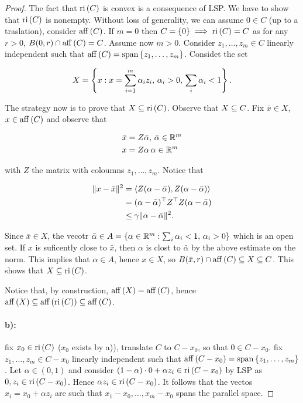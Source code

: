 \begin{proof}
    
    The fact that $\mathrm{ri}\left(C\right)$ is convex is a consequence of LSP. We have to show that $\mathrm{ri}\left(C\right)$ is nonempty. Without loss of generality, we can assume $0 \in C$ (up to a traslation), consider $\mathrm{aff}\left(C\right)$. If $m = 0$ then $C = \left\{ 0 \right\} \implies \mathrm{ri}\left(C\right) = C$ as for any $r > 0$, $B(0,r) \cap \mathrm{aff}\left(C\right) = C$. Assume now $m > 0$. Consider $z_1,\dots,z_m \in C$ linearly independent such that $\mathrm{aff}\left(C\right) = \mathrm{span}\left\{ z_1,\dots,z_m \right\}$. Considet the set 

    \[ X = \left\{ x : x = \sum_{i=1}^m \alpha_i z_i,\,\alpha_i > 0,\, \sum_i \alpha_i < 1 \right\}. \]

    The strategy now is to prove that $X \subseteq \mathrm{ri}\left(C\right)$. Observe that $X \subseteq C$. Fix $\bar{x} \in X$, $x \in \mathrm{aff}\left(C\right)$ and observe that 
    
    \begin{align*}
        \bar{x} &= Z \bar{\alpha},\, \bar{\alpha } \in \mathbb{R}^m \\
        x &= Z \alpha \, \alpha \in \mathbb{R}^m
    \end{align*}

    with $Z$ the matrix with coloumns $z_1,\dots,z_m$. Notice that 

    \begin{align*}
        \lVert x - \bar{x} \rVert^2 &= \langle Z(\alpha - \bar{\alpha}), Z(\alpha - \bar{\alpha}) \rangle \\
            &= (\alpha - \bar{\alpha})^\top Z^\top Z (\alpha - \bar{\alpha}) \\
            &\le \gamma \lVert \alpha - \bar{\alpha} \rVert^2.
    \end{align*}

    Since $\bar{x} \in X$, the vecotr $\bar{\alpha} \in A = \left\{ \alpha \in \mathbb{R}^m : \sum_{i} \alpha_i < 1, \, \alpha_i > 0 \right\}$ which is an open set. If $x$ is suficently close to $\bar{x}$, then $\alpha$ is clost to $\bar{\alpha}$ by the above estimate on the norm. This implies that $\alpha \in A$, hence $x \in X$, so $B(\bar{x},r) \cap \mathrm{aff}\left(C\right) \subseteq X \subseteq C$. This shows that $X \subseteq \mathrm{ri}\left(C\right)$.

    Notice that, by construction, $\mathrm{aff}\left(X\right) = \mathrm{aff}\left(C\right)$, hence $\mathrm{aff}\left(X\right) \subseteq \mathrm{aff}\left(\mathrm{ri}\left(C\right)\right) \subseteq \mathrm{aff}\left(C\right)$.

    \paragraph{b):} fix $x_0 \in \mathrm{ri}\left(C\right)$ ($x_0$ exists by a)), translate $C$ to $C - x_0$, so that $0 \in C - x_0$. fix $z_1,\dots,z_m \in C - x_0$ linearly independent such that $\mathrm{aff}\left(C - x_0\right) = \mathrm{span}\left\{ z_1,\dots,z_m \right\}$. Let $\alpha \in (0,1)$ and consider $(1-\alpha)\cdot 0 + \alpha z_i \in \mathrm{ri}\left(C-x_0\right)$ by LSP as $0,z_i \in \mathrm{ri}\left(C-x_0\right)$. Hence $\alpha z_i \in \mathrm{ri}\left(C-x_0\right)$. It follows that the vectos $x_i = x_0 + \alpha z_i$ are such that $x_1 - x_0, \dots, x_m-x_0$ spans the parallel space.

\end{proof}

